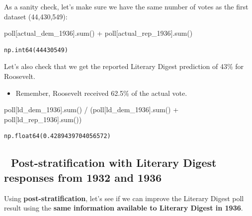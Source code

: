 \documentclass[
  letterpaper,
  DIV=11,
  numbers=noendperiod]{scrreprt}
\newenvironment{Shaded}{\begin{snugshade}}{\end{snugshade}}
\newcommand{\BuiltInTok}[1]{\textcolor[rgb]{0.00,0.23,0.31}{#1}}
\newcommand{\NormalTok}[1]{\textcolor[rgb]{0.00,0.23,0.31}{#1}}
\newcommand{\OperatorTok}[1]{\textcolor[rgb]{0.37,0.37,0.37}{#1}}
\newcommand{\StringTok}[1]{\textcolor[rgb]{0.13,0.47,0.30}{#1}}
\providecommand{\tightlist}{%
  \setlength{\itemsep}{0pt}\setlength{\parskip}{0pt}}\usepackage{longtable,booktabs,array}
\begin{document}
As a sanity check, let's make sure we have the same number of votes as
the first dataset (44,430,549):

\begin{Shaded}
\begin{Highlighting}[]
\NormalTok{poll[}\StringTok{\textquotesingle{}actual\_dem\_1936\textquotesingle{}}\NormalTok{].}\BuiltInTok{sum}\NormalTok{() }\OperatorTok{+}\NormalTok{ poll[}\StringTok{\textquotesingle{}actual\_rep\_1936\textquotesingle{}}\NormalTok{].}\BuiltInTok{sum}\NormalTok{()}
\end{Highlighting}
\end{Shaded}

\begin{verbatim}
np.int64(44430549)
\end{verbatim}

Let's also check that we get the reported Literary Digest prediction of
43\% for Roosevelt.

\begin{itemize}
\tightlist
\item
  Remember, Roosevelt received 62.5\% of the actual vote.
\end{itemize}

\begin{Shaded}
\begin{Highlighting}[]
\NormalTok{poll[}\StringTok{\textquotesingle{}ld\_dem\_1936\textquotesingle{}}\NormalTok{].}\BuiltInTok{sum}\NormalTok{() }\OperatorTok{/}\NormalTok{ (poll[}\StringTok{\textquotesingle{}ld\_dem\_1936\textquotesingle{}}\NormalTok{].}\BuiltInTok{sum}\NormalTok{() }\OperatorTok{+}\NormalTok{ poll[}\StringTok{\textquotesingle{}ld\_rep\_1936\textquotesingle{}}\NormalTok{].}\BuiltInTok{sum}\NormalTok{())}
\end{Highlighting}
\end{Shaded}

\begin{verbatim}
np.float64(0.4289439704056572)
\end{verbatim}

\subsection{🥞 Post-stratification with Literary Digest responses from
1932 and
1936}\label{post-stratification-with-literary-digest-responses-from-1932-and-1936}

Using \textbf{post-stratification}, let's see if we can improve the
Literary Digest poll result using the \textbf{same information available
to Literary Digest in 1936}.
\end{document}
